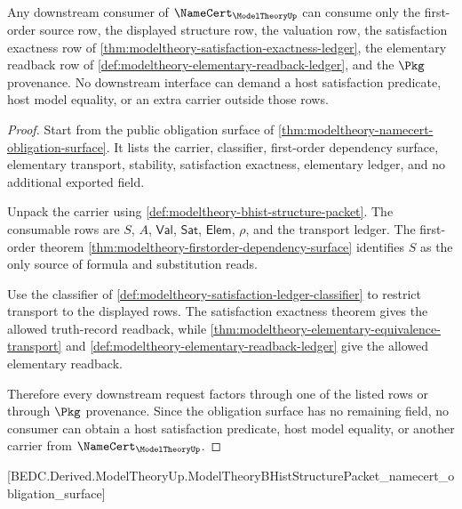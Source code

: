 \begin{theorem}\label{thm:modeltheory-downstream-consumer-interface}
Any downstream consumer of $\NameCert_{\ModelTheoryUp}$ can consume only the
first-order source row, the displayed structure row, the valuation row, the
satisfaction exactness row of
\autoref{thm:modeltheory-satisfaction-exactness-ledger}, the elementary
readback row of \autoref{def:modeltheory-elementary-readback-ledger}, and the
$\Pkg$ provenance. No downstream interface can demand a host satisfaction
predicate, host model equality, or an extra carrier outside those rows.
\end{theorem}
\begin{proof}
Start from the public obligation surface of
\autoref{thm:modeltheory-namecert-obligation-surface}. It lists the carrier,
classifier, first-order dependency surface, elementary transport, stability,
satisfaction exactness, elementary ledger, and no additional exported field.

Unpack the carrier using
\autoref{def:modeltheory-bhist-structure-packet}. The consumable rows are
$S$, $A$, $\mathsf{Val}$, $\mathsf{Sat}$, $\mathsf{Elem}$, $\rho$, and the
transport ledger. The first-order theorem
\autoref{thm:modeltheory-firstorder-dependency-surface} identifies $S$ as the
only source of formula and substitution reads.

Use the classifier of
\autoref{def:modeltheory-satisfaction-ledger-classifier} to restrict
transport to the displayed rows. The satisfaction exactness theorem gives the
allowed truth-record readback, while
\autoref{thm:modeltheory-elementary-equivalence-transport} and
\autoref{def:modeltheory-elementary-readback-ledger} give the allowed
elementary readback.

Therefore every downstream request factors through one of the listed rows or
through $\Pkg$ provenance. Since the obligation surface has no remaining
field, no consumer can obtain a host satisfaction predicate, host model
equality, or another carrier from $\NameCert_{\ModelTheoryUp}$.
\end{proof}

[BEDC.Derived.ModelTheoryUp.ModelTheoryBHistStructurePacket\_namecert\_obligation\_surface]

